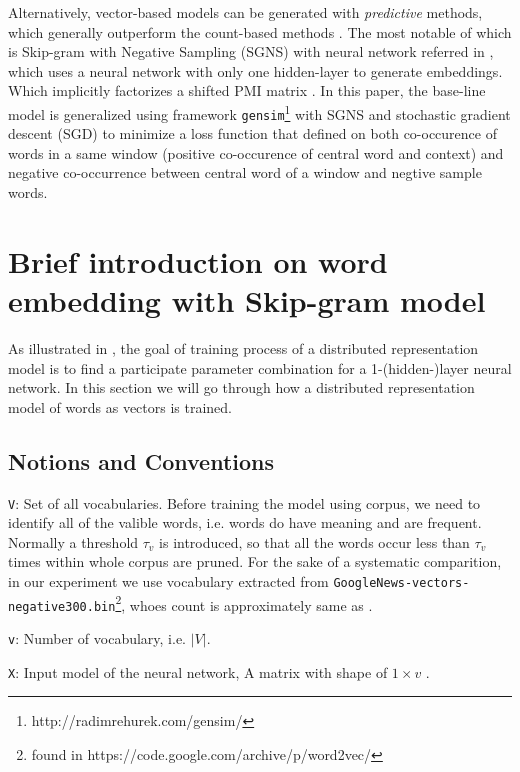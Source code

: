 \documentclass[11pt,a4paper]{article}
\begin{document}
Alternatively, vector-based models can be generated with \emph{predictive} methods, which generally outperform the count-based methods \cite{levy2015improving}. The most notable of which is Skip-gram with Negative Sampling (SGNS) with neural network referred in \cite{mikolov2013distributed}, which uses a neural network with only one hidden-layer to generate embeddings. Which implicitly factorizes a shifted PMI matrix \cite{levy2014neural}. In this paper, the base-line model is generalized using framework \verb|gensim|\footnote{http://radimrehurek.com/gensim/} with SGNS and stochastic gradient descent (SGD) to minimize a loss function that defined on both co-occurence of words in a same window (positive co-occurence of central word and context) and negative co-occurrence between central word of a window and negtive sample words. 

\section{Brief introduction on word embedding with Skip-gram model}
As illustrated in \cite{mikolov2013distributed}, the goal of training process of a distributed representation model is to find a participate parameter combination for a 1-(hidden-)layer neural network. In this section we will go through how a distributed representation model of words as vectors is trained.

  \subsection{Notions and Conventions}
  \verb|V|: Set of all vocabularies. Before training the model using corpus, we need to identify all of the valible words, i.e. words do have meaning and are frequent. Normally a threshold $\tau_v$ is introduced, so that all the words occur less than $\tau_v$ times within whole corpus are pruned. For the sake of a systematic comparition, in our experiment we use vocabulary extracted from \verb|GoogleNews-vectors-negative300.bin|\footnote{found in https://code.google.com/archive/p/word2vec/}, whoes count is approximately same as \cite{levy2015improving}.

  \verb|v|: Number of vocabulary, i.e. $|V|$.

  \verb|X|: Input model of the neural network, A matrix with shape of $1 \times v$ .
\end{document}
